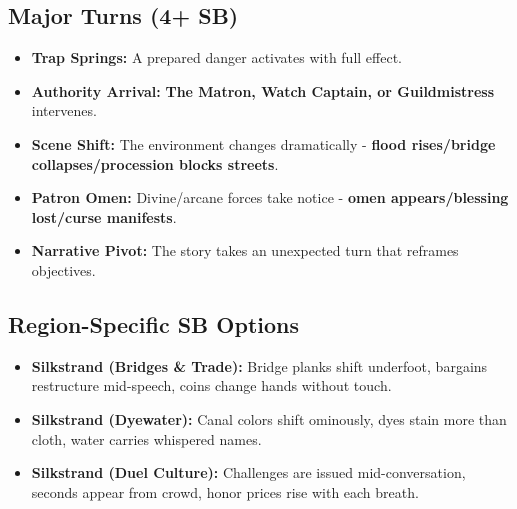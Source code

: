 \subsection*{Major Turns (4+ SB)}
\begin{itemize}
\item \textbf{Trap Springs:} A prepared danger activates with full effect.
\item \textbf{Authority Arrival:} \textbf{The Matron, Watch Captain, or Guildmistress} intervenes.
\item \textbf{Scene Shift:} The environment changes dramatically - \textbf{flood rises/bridge collapses/procession blocks streets}.
\item \textbf{Patron Omen:} Divine/arcane forces take notice - \textbf{omen appears/blessing lost/curse manifests}.
\item \textbf{Narrative Pivot:} The story takes an unexpected turn that reframes objectives.
\end{itemize}

\subsection*{Region-Specific SB Options}
\begin{itemize}
\item \textbf{Silkstrand (Bridges \& Trade):} Bridge planks shift underfoot, bargains restructure mid-speech, coins change hands without touch.
\item \textbf{Silkstrand (Dyewater):} Canal colors shift ominously, dyes stain more than cloth, water carries whispered names.
\item \textbf{Silkstrand (Duel Culture):} Challenges are issued mid-conversation, seconds appear from crowd, honor prices rise with each breath.
\end{itemize}
